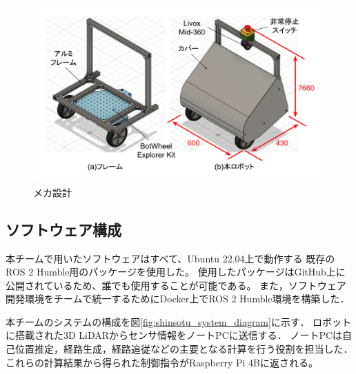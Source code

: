\documentclass[twocolumn,9pt]{jsproceedings}
\begin{document}

\begin{figure}[h]
  \begin{center}
    \includegraphics[width=1.0\linewidth]{figs/robot_flame.pdf}
    \caption{メカ設計}
    \label{fig:robot_flame}
  \end{center}
\end{figure}

\subsection{ソフトウェア構成}\label{sub:software}

本チームで用いたソフトウェアはすべて、Ubuntu 22.04上で動作する
既存のROS 2 Humble用のパッケージを使用した。
使用したパッケージはGitHub上に公開されているため、誰でも使用することが可能である。
また，ソフトウェア開発環境をチームで統一するためにDocker上でROS 2 Humble環境を構築した．

本チームのシステムの構成を図\ref{fig:shinsotu_system_diagram}に示す．
ロボットに搭載された3D LiDARからセンサ情報をノートPCに送信する．
ノートPCは自己位置推定，経路生成，経路追従などの主要となる計算を行う役割を担当した．
これらの計算結果から得られた制御指令がRaspberry Pi 4Bに返される。
\end{document}
